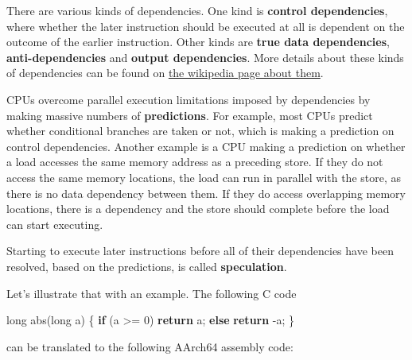 \documentclass[
  a4paper,
]{report}
\newenvironment{Shaded}{}{}
\newcommand{\ControlFlowTok}[1]{\textcolor[rgb]{0.00,0.44,0.13}{\textbf{#1}}}
\newcommand{\DataTypeTok}[1]{\textcolor[rgb]{0.56,0.13,0.00}{#1}}
\newcommand{\DecValTok}[1]{\textcolor[rgb]{0.25,0.63,0.44}{#1}}
\newcommand{\NormalTok}[1]{#1}
\newcommand{\OperatorTok}[1]{\textcolor[rgb]{0.40,0.40,0.40}{#1}}
\begin{document}
There are various kinds of dependencies. One kind is
\textbf{\label{__index_entry_167}{control
dependencies}}, where whether the later
instruction should be executed at all is dependent on the outcome of the
earlier instruction. Other kinds are
\textbf{\label{__index_entry_168}{true data
dependencies}},
\textbf{\label{__index_entry_169}{anti-dependencies}}
and \textbf{\label{__index_entry_170}{output
dependencies}}. More details about these kinds
of dependencies can be found on
\href{https://en.wikipedia.org/wiki/Data_dependency}{the wikipedia page
about them}.

CPUs overcome parallel execution limitations imposed by dependencies by
making massive numbers of
\textbf{\label{__index_entry_171}{predictions}}.
For example, most CPUs predict whether conditional branches are taken or
not, which is making a prediction on control dependencies. Another
example is a CPU making a prediction on whether a load accesses the same
memory address as a preceding store. If they do not access the same
memory locations, the load can run in parallel with the store, as there
is no data dependency between them. If they do access overlapping memory
locations, there is a dependency and the store should complete before
the load can start executing.

Starting to execute later instructions before all of their dependencies
have been resolved, based on the predictions, is called
\textbf{\label{__index_entry_172}{speculation}}.

Let's illustrate that with an example. The following C code

\begin{Shaded}
\begin{Highlighting}[]
\DataTypeTok{long}\NormalTok{ abs}\OperatorTok{(}\DataTypeTok{long}\NormalTok{ a}\OperatorTok{)} \OperatorTok{\{}
  \ControlFlowTok{if} \OperatorTok{(}\NormalTok{a }\OperatorTok{\textgreater{}=} \DecValTok{0}\OperatorTok{)}
    \ControlFlowTok{return}\NormalTok{ a}\OperatorTok{;}
  \ControlFlowTok{else}
    \ControlFlowTok{return} \OperatorTok{{-}}\NormalTok{a}\OperatorTok{;}
\OperatorTok{\}}
\end{Highlighting}
\end{Shaded}

can be translated to the following AArch64 assembly code:
\end{document}
